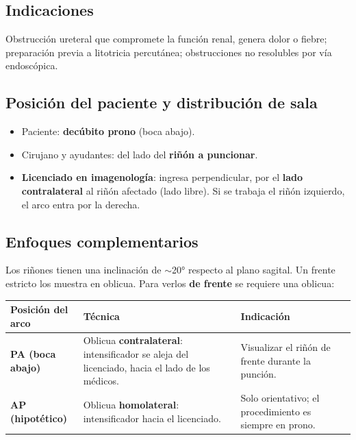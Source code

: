 {\subsection*{Indicaciones}
Obstrucción ureteral que compromete la función renal, genera dolor o fiebre; preparación previa a litotricia percutánea; obstrucciones no resolubles por vía endoscópica.

\subsection*{Posición del paciente y distribución de sala}

\begin{itemize}[noitemsep]
  \item Paciente: \textbf{decúbito prono} (boca abajo).
  \item Cirujano y ayudantes: del lado del \textbf{riñón a puncionar}.
  \item \textbf{Licenciado en imagenología}: ingresa perpendicular, por el \textbf{lado contralateral} al riñón afectado (lado libre). Si se trabaja el riñón izquierdo, el arco entra por la derecha.
\end{itemize}

\subsection*{Enfoques complementarios}

Los riñones tienen una inclinación de $\sim$20° respecto al plano sagital. Un frente estricto los muestra en oblicua. Para verlos \textbf{de frente} se requiere una oblicua:

{\renewcommand{\arraystretch}{1.35}
\begin{center}
\begin{tabular}{>{\bfseries}p{3cm} p{5.5cm} p{5.5cm}}
\hline
Posición del arco & Técnica & Indicación \\
\hline
PA (boca abajo) & Oblicua \textbf{contralateral}: intensificador se aleja del licenciado, hacia el lado de los médicos. & Visualizar el riñón de frente durante la punción. \\[0.5em]
\hline
AP (hipotético) & Oblicua \textbf{homolateral}: intensificador hacia el licenciado. & Solo orientativo; el procedimiento es siempre en prono. \\
\hline
\end{tabular}
\end{center}
}

\clearpage

}
